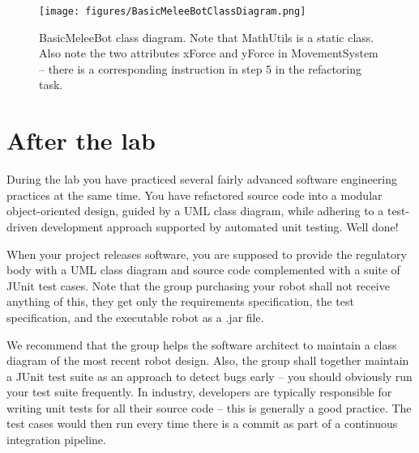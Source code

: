 \documentclass{scrreprt}
\begin{document}
\begin{figure}
\centering
\texttt{[image: figures/BasicMeleeBotClassDiagram.png]}
\caption{BasicMeleeBot class diagram. Note that MathUtils is a static class. Also note the two attributes xForce and yForce in MovementSystem -- there is a corresponding instruction in step 5 in the refactoring task.}
\label{fig:classDiagram}
\end{figure}

\newpage

\chapter{After the lab}
During the lab you have practiced several fairly advanced software engineering practices at the same time. You have refactored source code into a modular object-oriented design, guided by a UML class diagram, while adhering to a test-driven development approach supported by automated unit testing. Well done!

When your project releases software, you are supposed to provide the regulatory body with a UML class diagram and source code complemented with a suite of JUnit test cases. Note that the group purchasing your robot shall not receive anything of this, they get only the requirements specification, the test specification, and the executable robot as a .jar file.

We recommend that the group helps the software architect to maintain a class diagram of the most recent robot design. Also, the group shall together maintain a JUnit test suite as an approach to detect bugs early -- you should obviously run your test suite frequently. In industry, developers are typically responsible for writing unit tests for all their source code -- this is generally a good practice. The test cases would then run every time there is a commit as part of a continuous integration pipeline.
\end{document}
